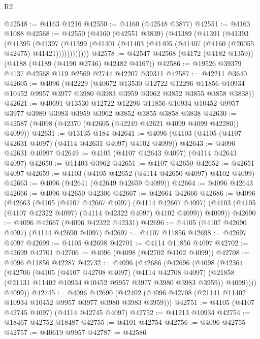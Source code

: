 \begin{lexlean}{R2}
\begin{coremodule}
@42548 := @4163 @1216
@42550 := @4160 (@42548 @3877)
@42551 := @4163 @1088
@42568 := @42550
    (@4160
      (@42551 @3839)
      (@41389
        (@41391
          (@41393
            (@41395
              (@41397
                (@41399 (@41401 (@41403 (@41405 (@41407 (@4160 (@20055 @42475) @41421))))))))))))
@42578 := @42547 @42568 (@4172 (@4182 @1359)) (@4188 (@4189 (@4190 @2746) @42482 @4167))
@42586 := @19526 @39379 @4137 @42568 @119 @2569 @2744 @42207 @39311
@42587 := @42211 @3640
@42605 := @4096
    (@42229
      (@40672
        @13530
        @12722
        @12296
        @11856
        @10934
        @10452
        @9957
        @3977
        @3980
        @3983
        @3959
        @3962
        @3852
        @3855
        @3858
        @3838))
@42621 := @40691
    @13530
    @12722
    @12296
    @11856
    @10934
    @10452
    @9957
    @3977
    @3980
    @3983
    @3959
    @3962
    @3852
    @3855
    @3858
    @3838
@42630 := @42587 (@4098 (@42370 (@42605 (@42249 @42621 @4099 @4099 @42280)) @4099))
@42631 := @13135 @184
@42641 := @4096 (@4103 (@4105 (@4107 @42631 @4097) (@4114 @42631 @4097) @4102 @4099))
@42643 := @4096 @42631 @40997
@42649 := @4105 (@4107 @42643 @4097) (@4114 @42643 @4097)
@42650 := @11403 @3962
@42651 := @4107 @42650
@42652 := @42651 @4097
@42659 := @4103 (@4105 @42652 (@4114 @42650 @4097) @4102 @4099)
@42663 := @4096 (@42641 (@42649 @42659 @4099))
@42664 := @4096 @42643
@42666 := @4096 @42650 @42306
@42667 := @42664 @42666
@42686 := @4096
    (@42663
      (@4105
        (@4107 @42667 @4097)
        (@4114 @42667 @4097)
        (@4103 (@4105 (@4107 @42322 @4097) (@4114 @42322 @4097) @4102 @4099))
        @4099))
@42690 := @4096 @42667 (@4096 @42322 @42331)
@42696 := @4105 (@4107 @42690 @4097) (@4114 @42690 @4097)
@42697 := @4107 @11856
@42698 := @42697 @4097
@42699 := @4105 @42698
@42701 := @4114 @11856 @4097
@42702 := @42699 @42701
@42706 := @4096 (@4098 (@42702 @4102 @4099))
@42708 := @4096 @11856 @42287
@42732 := @4096
    (@42686
      (@42696
        (@4098
          (@42364
            (@42706
              (@4105
                (@4107 @42708 @4097)
                (@4114 @42708 @4097)
                (@21858 (@21131 @11402 @10934 @10452 @9957 @3977 @3980 @3983 @3959))
                @4099))))
        @4099))
@42745 := @4096
    @42690
    (@42402 (@4096 @42708 (@21141 @11402 @10934 @10452 @9957 @3977 @3980 @3983 @3959)))
@42751 := @4105 (@4107 @42745 @4097) (@4114 @42745 @4097)
@42752 := @41213 @10934
@42754 := @18467 @42752 @18487
@42755 := @4101 @42754
@42756 := @4096 @42755
@42757 := @40619 @9957
@42787 := @42586

\end{coremodule}
\end{lexlean}
